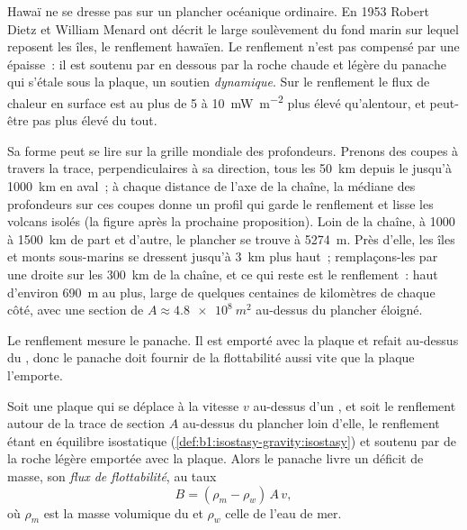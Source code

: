 Hawaï ne se dresse pas sur un plancher océanique ordinaire. En 1953 Robert Dietz et
William Menard ont décrit le large soulèvement du fond marin sur lequel reposent les îles,
le renflement hawaïen. Le renflement n'est pas compensé par une  épaisse~: il est
soutenu par en dessous par la roche chaude et légère du panache qui s'étale sous
la plaque, un soutien \emph{dynamique}. Sur le renflement le flux de chaleur en
surface est au plus de 5 à \qty{10}{mW.m^{-2}} plus élevé qu'alentour, et peut-être
pas plus élevé du tout.

Sa forme peut se lire sur la grille mondiale des profondeurs. Prenons des coupes à travers la
trace, perpendiculaires à sa direction, tous les \qty{50}{km} depuis le  jusqu'à
\qty{1000}{km} en aval~; à chaque distance de l'axe de la chaîne, la
médiane des profondeurs sur ces coupes donne un profil qui garde le renflement et
lisse les volcans isolés (la figure après la prochaine proposition). Loin de la chaîne, à 1000 à
\qty{1500}{km} de part et d'autre, le plancher se trouve à \qty{5274}{m}. Près d'elle,
les îles et monts sous-marins se dressent jusqu'à \qty{3}{km} plus haut~; remplaçons-les par une
droite sur les \qty{300}{km} de la chaîne, et ce qui reste est le
renflement~: haut d'environ \qty{690}{m} au plus, large de quelques centaines de kilomètres de chaque
côté, avec une section de $A \approx \qty{4.8e8}{m^2}$ au-dessus du plancher
éloigné.

Le renflement mesure le panache. Il est emporté avec la plaque et refait
au-dessus du , donc le panache doit fournir de la flottabilité aussi vite que la plaque
l'emporte.

\begin{proposition}\label{prop:b1:hotspots:buoyancy}
Soit une plaque qui se déplace à la vitesse $v$ au-dessus d'un , et soit le renflement autour de
la trace de section $A$ au-dessus du plancher loin d'elle, le renflement étant en
équilibre isostatique (\cref{def:b1:isostasy-gravity:isostasy}) et soutenu
par de la roche légère emportée avec la plaque. Alors le panache livre un déficit
de masse, son \emph{flux de flottabilité}, au taux
\[
  B = (\rho_m - \rho_w)\,A\,v ,
\]
où $\rho_m$ est la masse volumique du  et $\rho_w$ celle de l'eau de mer.
\end{proposition}

